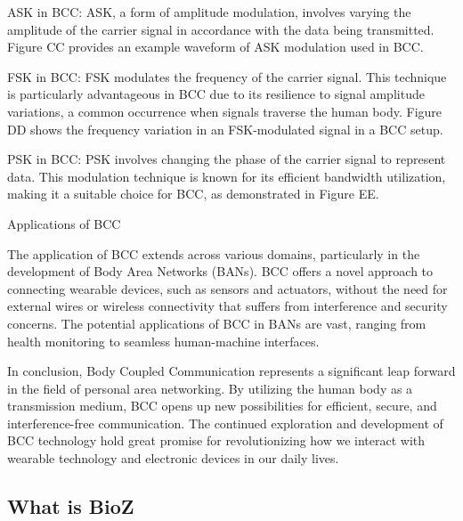 {ASK in BCC: ASK, a form of amplitude modulation, involves varying the amplitude of the carrier signal in accordance with the data being transmitted. Figure CC provides an example waveform of ASK modulation used in BCC.

FSK in BCC: FSK modulates the frequency of the carrier signal. This technique is particularly advantageous in BCC due to its resilience to signal amplitude variations, a common occurrence when signals traverse the human body. Figure DD shows the frequency variation in an FSK-modulated signal in a BCC setup.

PSK in BCC: PSK involves changing the phase of the carrier signal to represent data. This modulation technique is known for its efficient bandwidth utilization, making it a suitable choice for BCC, as demonstrated in Figure EE.

Applications of BCC

The application of BCC extends across various domains, particularly in the development of Body Area Networks (BANs). BCC offers a novel approach to connecting wearable devices, such as sensors and actuators, without the need for external wires or wireless connectivity that suffers from interference and security concerns. The potential applications of BCC in BANs are vast, ranging from health monitoring to seamless human-machine interfaces.

In conclusion, Body Coupled Communication represents a significant leap forward in the field of personal area networking. By utilizing the human body as a transmission medium, BCC opens up new possibilities for efficient, secure, and interference-free communication. The continued exploration and development of BCC technology hold great promise for revolutionizing how we interact with wearable technology and electronic devices in our daily lives.


}
\fi

\subsection{What is BioZ}

